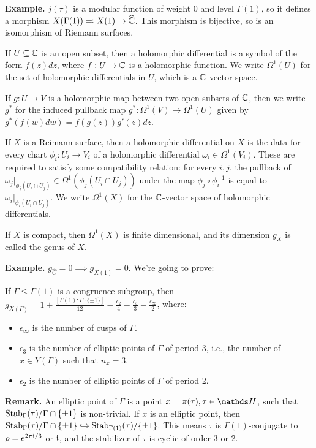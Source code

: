 \documentclass[10pt,a4paper]{article}
\begin{document}
\textbf{Example.} $j(\tau)$ is a modular function of weight 0 and level $\Gamma(1)$, so it defines a morphism $X(\Gamma(1)) \eqqcolon X(1) \to \widehat{\mathbb{C}}$. This morphism is bijective, so is an isomorphism of Riemann surfaces.
\begin{definition}
  If $U \subseteq \mathbb{C}$ is an open subset, then a holomorphic differential is a symbol of the form $f(z)dz$, where $f:U \to \mathbb{C}$ is a holomorphic function. We write $\Omega^1(U)$ for the set of holomorphic differentials in $U$, which is a $\mathbb{C}$-vector space.

  If $g: U \to V$ is a holomorphic map between two open subsets of $\mathbb{C}$, then we write $g^\ast$ for the induced pullback map $g^\ast:\Omega^1(V) \to \Omega^1(U)$ given by $g^\ast(f(w)dw) = f(g(z))g'(z)dz$.

  If $X$ is a Reimann surface, then a holomorphic differential on $X$ is the data for every chart $\phi_i : U_i \to V_i$ of a holomorphic differential $\omega_i \in \Omega^1(V_i)$. These are required to satisfy some compatibility relation: for every $i,j$, the pullback of $\omega_j|_{\phi_j(U_i \cap U_j)} \in \Omega^1(\phi_j(U_i \cap U_j))$ under the map $\phi_j \circ \phi_i^{-1}$ is equal to $\omega_i|_{\phi_i(U_i \cap U_j)}$. We write $\Omega^1(X)$ for the $\mathbb{C}$-vector space of holomorphic differentials.
\end{definition}
\begin{theorem}
  If $X$ is compact, then $\Omega^1(X)$ is finite dimensional, and its dimension $g_X$ is called the genus of $X$.
\end{theorem}
\textbf{Example.} $g_{\hat{C}} = 0 \implies g_{X(1)} = 0$. We're going to prove:
\begin{theorem}
  If $\Gamma \leq \Gamma(1)$ is a congruence subgroup, then $g_{X(\Gamma)} = 1+ \frac{[\Gamma(1):\Gamma \cdot \{\pm 1\}]}{12} - \frac{\epsilon_2}{4} - \frac{\epsilon_3}{3} - \frac{\epsilon_\infty}{2}$, where:
  \begin{itemize}
    \item $\epsilon_\infty$ is the number of cusps of $\Gamma$.
    \item $\epsilon_3$ is the number of elliptic points of $\Gamma$ of period 3, i.e., the number of $x \in Y(\Gamma)$ such that $n_x = 3$.
    \item $\epsilon_2$ is the number of elliptic points of $\Gamma$ of period 2.
  \end{itemize}
\end{theorem}
\textbf{Remark.} An elliptic point of $\Gamma$ is a point $x = \pi(\tau), \tau \in \H$, such that $\operatorname{Stab}_\Gamma(\tau)/\Gamma \cap \{\pm 1\}$ is non-trivial. If $x$ is an elliptic point, then $\operatorname{Stab}_\Gamma(\tau)/\Gamma \cap \{\pm 1\} \hookrightarrow \operatorname{Stab}_{\Gamma(1)}(\tau)/\{\pm 1\}$. This means $\tau$ is $\Gamma(1)$-conjugate to $\rho = e^{2\pi\mathfrak{i}/3}$ or $\mathfrak{i}$, and the stabilizer of $\tau$ is cyclic of order 3 or 2.
\end{document}
